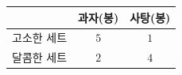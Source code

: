 \begin{tabular}{|c|c|c|}
\hline
 & 과자(봉) & 사탕(봉) \\
\hline
고소한 세트 & $5$ & $1$ \\
\hline
달콤한 세트 & $2$ & $4$ \\
\hline
\end{tabular}
